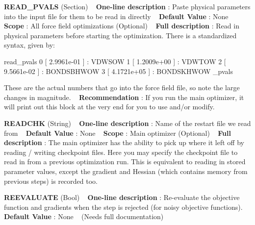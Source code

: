 \begin{DoxyItemize}
\item {\bfseries  R\+E\+A\+D\+\_\+\+P\+V\+A\+LS } (Section) ~\newline
{\bfseries  One-\/line description }\+: Paste physical parameters into the input file for them to be read in directly ~\newline
{\bfseries  Default Value }\+: None ~\newline
{\bfseries  Scope }\+: All force field optimizations (Optional) ~\newline
{\bfseries  Full description }\+: Read in physical parameters before starting the optimization. There is a standardized syntax, given by\+: \begin{DoxyVerb}read_pvals
  0 [  2.9961e-01 ] : VDWSOW
  1 [  1.2009e+00 ] : VDWTOW
  2 [  9.5661e-02 ] : BONDSBHWOW
  3 [  4.1721e+05 ] : BONDSKHWOW
  \read_pvals \end{DoxyVerb}
 These are the actual numbers that go into the force field file, so note the large changes in magnitude. ~\newline
{\bfseries  Recommendation }\+: If you run the main optimizer, it will print out this block at the very end for you to use and/or modify.\end{DoxyItemize}
\begin{DoxyItemize}
\item {\bfseries  R\+E\+A\+D\+C\+HK } (String) ~\newline
{\bfseries  One-\/line description }\+: Name of the restart file we read from ~\newline
{\bfseries  Default Value }\+: None ~\newline
{\bfseries  Scope }\+: Main optimizer (Optional) ~\newline
{\bfseries  Full description }\+: The main optimizer has the ability to pick up where it left off by reading / writing checkpoint files. Here you may specify the checkpoint file to read in from a previous optimization run. This is equivalent to reading in stored parameter values, except the gradient and Hessian (which contains memory from previous steps) is recorded too.\end{DoxyItemize}
\begin{DoxyItemize}
\item {\bfseries  R\+E\+E\+V\+A\+L\+U\+A\+TE } (Bool) ~\newline
{\bfseries  One-\/line description }\+: Re-\/evaluate the objective function and gradients when the step is rejected (for noisy objective functions). ~\newline
{\bfseries  Default Value }\+: None ~\newline
(Needs full documentation)\end{DoxyItemize}
